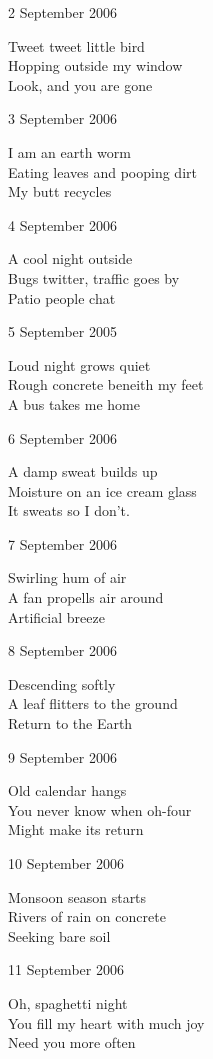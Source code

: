 \documentclass[12pt]{article}
\begin{document}
2 September 2006

Tweet tweet little bird \\
Hopping outside my window \\
Look, and you are gone

3 September 2006

I am an earth worm \\
Eating leaves and pooping dirt \\
My butt recycles

4 September 2006

A cool night outside \\
Bugs twitter, traffic goes by \\
Patio people chat

5 September 2005

Loud night grows quiet \\
Rough concrete beneith my feet \\
A bus takes me home

6 September 2006

A damp sweat builds up \\
Moisture on an ice cream glass \\
It sweats so I don't.


\newpage

7 September 2006

Swirling hum of air \\
A fan propells air around \\
Artificial breeze
      
8 September 2006
      
Descending softly \\
A leaf flitters to the ground \\
Return to the Earth
      
9 September 2006
      
Old calendar hangs \\
You never know when oh-four \\
Might make its return
      
10 September 2006
      
Monsoon season starts \\
Rivers of rain on concrete \\ 
Seeking bare soil
      
11 September 2006
      
Oh, spaghetti night \\
You fill my heart with much joy \\
Need you more often
      
\end{document}
